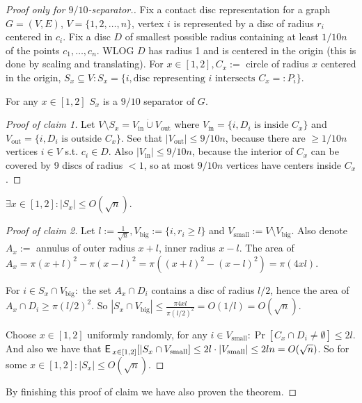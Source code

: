 \begin{proof}[Proof only for $9/10$-separator.]
	Fix a contact disc representation for a graph $G = (V,E)$, $V = \{1,2, \dots, n\}$, vertex $i$ is represented by a disc of radius $r_i$ centered in $c_i$. Fix a disc $D$ of smallest possible radius containing at least $1/10 n$ of the points $c_1, \dots, c_n$. WLOG $D$ has radius 1 and is centered in the origin (this is done by scaling and translating). For $x \in [1,2], C_x :=$ circle of radius $x$ centered in the origin, $S_x \subseteq V: S_x = \{i, \text{disc representing } i \text{ intersects } C_x =: P_i\}$.
	
	\begin{claim}[1]
		For any $x \in [1,2]$ $S_x$ is a $9/10$ separator of $G$.
	\end{claim}

	\begin{proof}[Proof of claim 1]
		Let $V \setminus S_x = V_{\text{in}} \dot{\cup} V_{\text{out}}$ where $V_\text{in} =\{i, D_i \text{ is inside } C_x\}$ and $V_\text{out} = \{i, D_i \text{ is outside } C_x\}$. See that $|V_{\text{out}}| \leq 9/10 n$, because there are $\geq 1/10 n$ vertices $i \in V$ s.t. $c_i \in D$. Also $|V_\text{in}| \leq 9/10 n$, because the interior of $C_x$ can be covered by 9 discs of radius $< 1$, so at most $9/10 n$ vertices have centers inside $C_x$.
	\end{proof}

	\begin{claim}[2]
		$\exists x \in [1,2] : |S_x| \leq O(\sqrt{n})$.
	\end{claim}

	\begin{proof}[Proof of claim 2]
		Let $l := \frac{1}{\sqrt{n}}, V_\text{big} := \{i, r_i \geq l\}$ and $V_\text{small} := V \setminus V_\text{big}$. Also denote $A_x :=$ annulus of outer radius $x+l$, inner radius $x-l$. The area of $A_x = \pi (x+l)^2 - \pi(x-l)^2 = \pi ((x+l)^2 - (x-l)^2) = \pi(4xl)$.
		
		For $i \in S_x \cap V_{\text{big}}:$ the set $A_x \cap D_i$ contains a disc of radius $l/2$, hence the area of $A_x \cap D_i \geq \pi(l/2)^2$. So $|S_x \cap V_{\text{big}}| \leq \frac{\pi 4xl}{\pi(l/2)^2} = O(1/l) = O(\sqrt{n})$.
		
		Choose $x \in [1,2]$ uniformly randomly, for any $i \in V_\text{small} : \Pr [C_x \cap D_{i} \neq \emptyset] \leq 2l$. And also we have that $\operatorname{\textsf{E}\,}_{x \in [1,2]} [|S_x \cap V_\text{small}] \leq 2l \cdot |V_\text{small}| \leq 2ln = O(\sqrt{n})$. So for some $x \in [1,2] : |S_x| \leq O(\sqrt{n})$.
	\end{proof}

	\noindent By finishing this proof of claim we have also proven the theorem.
\end{proof}


